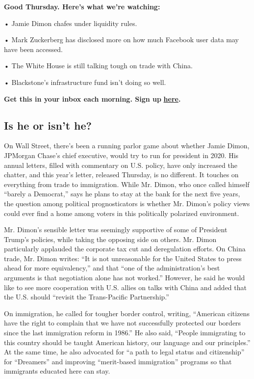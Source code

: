 \textbf{Good Thursday. Here's what we're watching:}

• Jamie Dimon chafes under liquidity rules.

• Mark Zuckerberg has disclosed more on how much Facebook user data may
have been accessed.

• The White House is still talking tough on trade with China.

• Blackstone's infrastructure fund isn't doing so well.

\textbf{Get this in your inbox each morning. Sign up}
\href{https://www.nytimes3xbfgragh.onion/newsletters/dealbook?pgtype=subscriptionspage\&version=new\&contentId=DK\&eventName=signup\&module=newsletter-sign-up\&region=button}{\textbf{here}}\textbf{.}

\hypertarget{is-he-or-isnt-he}{%
\subsection{Is he or isn't he?}\label{is-he-or-isnt-he}}

On Wall Street, there's been a running parlor game about whether Jamie
Dimon, JPMorgan Chase's chief executive, would try to run for president
in 2020. His annual letters, filled with commentary on U.S. policy, have
only increased the chatter, and this year's letter, released Thursday,
is no different. It touches on everything from trade to immigration.
While Mr. Dimon, who once called himself ``barely a Democrat,'' says he
plans to stay at the bank for the next five years, the question among
political prognosticators is whether Mr. Dimon's policy views could ever
find a home among voters in this politically polarized environment.

Mr. Dimon's sensible letter was seemingly supportive of some of
President Trump's policies, while taking the opposing side on others.
Mr. Dimon particularly applauded the corporate tax cut and deregulation
efforts. On China trade, Mr. Dimon writes: ``It is not unreasonable for
the United States to press ahead for more equivalency,'' and that ``one
of the administration's best arguments is that negotiation alone has not
worked.'' However, he said he would like to see more cooperation with
U.S. allies on talks with China and added that the U.S. should ``revisit
the Trans-Pacific Partnership.''

On immigration, he called for tougher border control, writing,
``American citizens have the right to complain that we have not
successfully protected our borders since the last immigration reform in
1986.'' He also said, ``People immigrating to this country should be
taught American history, our language and our principles.'' At the same
time, he also advocated for ``a path to legal status and citizenship''
for ``Dreamers'' and improving ``merit-based immigration'' programs so
that immigrants educated here can stay.

